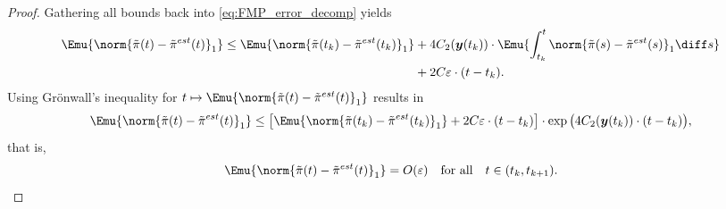 \begin{proof}
Gathering all bounds back into \eqref{eq:FMP_error_decomp} yields
\begin{align*}
    \Emu{\norm{\Tilde{\pi}(t) - \Tilde{\pi}^{est}(t)}_1} \leq \Emu{ \norm{ \Tilde{\pi}(t_k) - \Tilde{\pi}^{est}(t_k) }_1 } &+  4 C_2(\boldsymbol{y}(t_k)) \cdot \Emu{ \int_{t_k}^{t} \norm{\Tilde{\pi}(s) - \Tilde{\pi}^{est}(s)}_1 \diff s } \\
    & + 2C \varepsilon \cdot (t - t_k).
\end{align*}
Using Gr\"{o}nwall's inequality for $t \mapsto \Emu{\norm{ \Tilde{\pi}(t) - \Tilde{\pi}^{est} (t) }_1}$ results in
\begin{align*}
    \Emu{\norm{\Tilde{\pi}(t) - \Tilde{\pi}^{est}(t)}_1} \leq \left[ \Emu{ \norm{ \Tilde{\pi}(t_k) - \Tilde{\pi}^{est}(t_k) }_1 } + 2C \varepsilon \cdot (t - t_k) \right] \cdot \exp \big( 4 C_2(\boldsymbol{y}(t_k)) \cdot (t-t_k) \big),
\end{align*}
that is, 
\begin{align*}
    \Emu{\norm{\Tilde{\pi}(t) - \Tilde{\pi}^{est}(t)}_1} = O(\varepsilon) \quad \text{for all} \quad t \in (t_k, t_{k+1}). 
\end{align*}


\end{proof}
